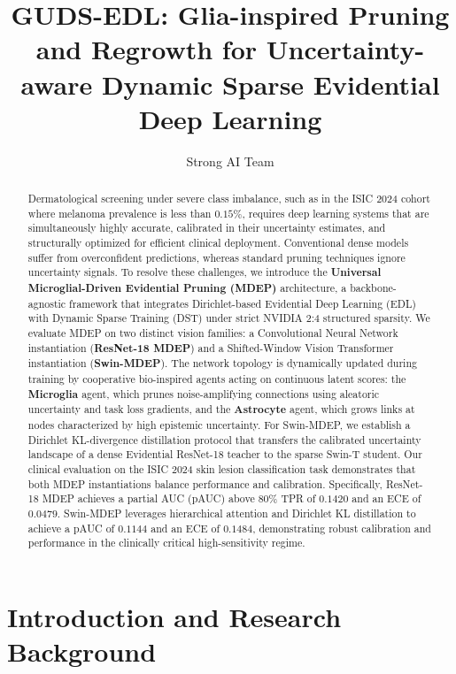\documentclass[letterpaper]{article} %
\title{GUDS-EDL: Glia-inspired Pruning and Regrowth for Uncertainty-aware Dynamic Sparse Evidential Deep Learning}
\author{Strong AI Team}
\begin{document}
\maketitle

\begin{abstract}
Dermatological screening under severe class imbalance, such as in the ISIC 2024 cohort where melanoma prevalence is less than $0.15\%$, requires deep learning systems that are simultaneously highly accurate, calibrated in their uncertainty estimates, and structurally optimized for efficient clinical deployment. Conventional dense models suffer from overconfident predictions, whereas standard pruning techniques ignore uncertainty signals. To resolve these challenges, we introduce the \textbf{Universal Microglial-Driven Evidential Pruning (MDEP)} architecture, a backbone-agnostic framework that integrates Dirichlet-based Evidential Deep Learning (EDL) with Dynamic Sparse Training (DST) under strict NVIDIA 2:4 structured sparsity. We evaluate MDEP on two distinct vision families: a Convolutional Neural Network instantiation (\textbf{ResNet-18 MDEP}) and a Shifted-Window Vision Transformer instantiation (\textbf{Swin-MDEP}). The network topology is dynamically updated during training by cooperative bio-inspired agents acting on continuous latent scores: the \textbf{Microglia} agent, which prunes noise-amplifying connections using aleatoric uncertainty and task loss gradients, and the \textbf{Astrocyte} agent, which grows links at nodes characterized by high epistemic uncertainty. For Swin-MDEP, we establish a Dirichlet KL-divergence distillation protocol that transfers the calibrated uncertainty landscape of a dense Evidential ResNet-18 teacher to the sparse Swin-T student. Our clinical evaluation on the ISIC 2024 skin lesion classification task demonstrates that both MDEP instantiations balance performance and calibration. Specifically, ResNet-18 MDEP achieves a partial AUC (pAUC) above 80\% TPR of $0.1420$ and an ECE of $0.0479$. Swin-MDEP leverages hierarchical attention and Dirichlet KL distillation to achieve a pAUC of $0.1144$ and an ECE of $0.1484$, demonstrating robust calibration and performance in the clinically critical high-sensitivity regime.
\end{abstract}

\section{Introduction and Research Background}\label{sec:intro}
\end{document}
